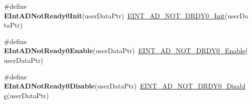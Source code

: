 \begin{DoxyCompactItemize}
\item 
\hypertarget{group___func_ala_ga60c68a2720bac63260bd1dddb357b939}{\#define {\bfseries E\-Int\-A\-D\-Not\-Ready0\-Init}(user\-Data\-Ptr)~\hyperlink{group___e_i_n_t___a_d___n_o_t___d_r_d_y0__module_ga8fdfdf050efb6e96f32eb368d3973f62}{E\-I\-N\-T\-\_\-\-A\-D\-\_\-\-N\-O\-T\-\_\-\-D\-R\-D\-Y0\-\_\-\-Init}(user\-Data\-Ptr)}\label{group___func_ala_ga60c68a2720bac63260bd1dddb357b939}

\item 
\hypertarget{group___func_ala_ga473aa5e6a30aed2e0c2212cdfab58c45}{\#define {\bfseries E\-Int\-A\-D\-Not\-Ready0\-Enable}(user\-Data\-Ptr)~\hyperlink{group___e_i_n_t___a_d___n_o_t___d_r_d_y0__module_gae37e9771827244ada4beed22069ed403}{E\-I\-N\-T\-\_\-\-A\-D\-\_\-\-N\-O\-T\-\_\-\-D\-R\-D\-Y0\-\_\-\-Enable}(user\-Data\-Ptr)}\label{group___func_ala_ga473aa5e6a30aed2e0c2212cdfab58c45}

\item 
\hypertarget{group___func_ala_ga64e0ad78642eaf5812d67e8603dd0072}{\#define {\bfseries E\-Int\-A\-D\-Not\-Ready0\-Disable}(user\-Data\-Ptr)~\hyperlink{group___e_i_n_t___a_d___n_o_t___d_r_d_y0__module_ga4588bd6095c97bca113999707136f299}{E\-I\-N\-T\-\_\-\-A\-D\-\_\-\-N\-O\-T\-\_\-\-D\-R\-D\-Y0\-\_\-\-Disable}(user\-Data\-Ptr)}\label{group___func_ala_ga64e0ad78642eaf5812d67e8603dd0072}

\end{DoxyCompactItemize}
